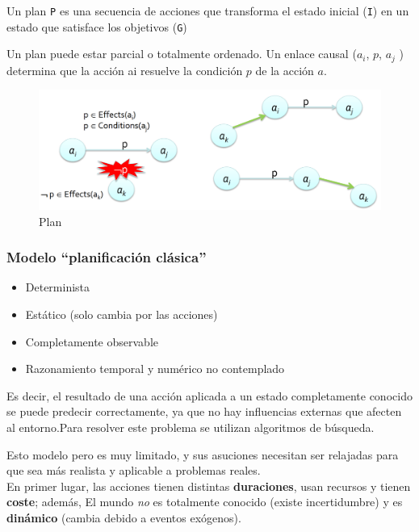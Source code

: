\begin{definition}[Plan]
   Un plan \lstinline|P| es una secuencia de acciones que transforma el estado
   inicial (\lstinline|I|) en un estado que satisface los objetivos (\lstinline|G|)
\end{definition}

\begin{paracol}{2}
   Un plan puede estar parcial o totalmente ordenado.
   Un enlace causal ($a_i$, $p$, $a_j$ ) determina que la acción ai resuelve la condición $p$ de la acción $a$.
   

   \switchcolumn

   \begin{figure}[htbp]
      \centering
      \includegraphics{images/02/planordenado.png}
      \caption{Plan}
      \label{fig:02/planordenado}
   \end{figure}

\end{paracol}

\subsubsection{Modelo ``planificación clásica''}
\begin{itemize}
	\item Determinista
	\item Estático (solo cambia por las acciones)
	\item Completamente observable
	\item Razonamiento temporal y numérico no contemplado
\end{itemize}

Es decir, el resultado de una acción aplicada a un estado
completamente conocido se puede predecir correctamente,
ya que no hay influencias externas que afecten al entorno.Para resolver este problema se utilizan algoritmos de búsqueda.

Esto modelo pero es muy limitado, y sus asuciones necesitan ser relajadas para que sea más realista y aplicable a problemas reales.\\
En primer lugar, las acciones tienen distintas \textbf{duraciones}, usan recursos y tienen \textbf{coste}; además, El mundo \textit{no} es totalmente conocido (existe incertidumbre) y es \textbf{dinámico} (cambia debido a eventos exógenos).


